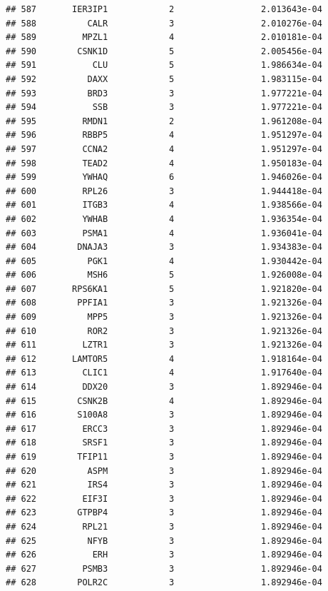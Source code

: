 \documentclass[
]{article}
\begin{document}
\begin{verbatim}
## 587       IER3IP1            2                 2.013643e-04
## 588          CALR            3                 2.010276e-04
## 589         MPZL1            4                 2.010181e-04
## 590        CSNK1D            5                 2.005456e-04
## 591           CLU            5                 1.986634e-04
## 592          DAXX            5                 1.983115e-04
## 593          BRD3            3                 1.977221e-04
## 594           SSB            3                 1.977221e-04
## 595         RMDN1            2                 1.961208e-04
## 596         RBBP5            4                 1.951297e-04
## 597         CCNA2            4                 1.951297e-04
## 598         TEAD2            4                 1.950183e-04
## 599         YWHAQ            6                 1.946026e-04
## 600         RPL26            3                 1.944418e-04
## 601         ITGB3            4                 1.938566e-04
## 602         YWHAB            4                 1.936354e-04
## 603         PSMA1            4                 1.936041e-04
## 604        DNAJA3            3                 1.934383e-04
## 605          PGK1            4                 1.930442e-04
## 606          MSH6            5                 1.926008e-04
## 607       RPS6KA1            5                 1.921820e-04
## 608        PPFIA1            3                 1.921326e-04
## 609          MPP5            3                 1.921326e-04
## 610          ROR2            3                 1.921326e-04
## 611         LZTR1            3                 1.921326e-04
## 612       LAMTOR5            4                 1.918164e-04
## 613         CLIC1            4                 1.917640e-04
## 614         DDX20            3                 1.892946e-04
## 615        CSNK2B            4                 1.892946e-04
## 616        S100A8            3                 1.892946e-04
## 617         ERCC3            3                 1.892946e-04
## 618         SRSF1            3                 1.892946e-04
## 619        TFIP11            3                 1.892946e-04
## 620          ASPM            3                 1.892946e-04
## 621          IRS4            3                 1.892946e-04
## 622         EIF3I            3                 1.892946e-04
## 623        GTPBP4            3                 1.892946e-04
## 624         RPL21            3                 1.892946e-04
## 625          NFYB            3                 1.892946e-04
## 626           ERH            3                 1.892946e-04
## 627         PSMB3            3                 1.892946e-04
## 628        POLR2C            3                 1.892946e-04

\end{verbatim}
\end{document}
